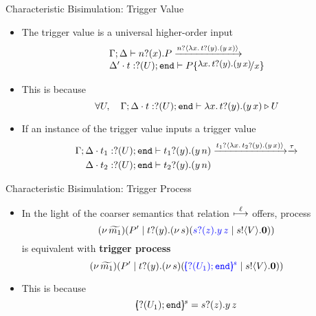 \documentclass{beamer}
\newcommand{\prcolor}[1]{{\color{blue} #1}}
\begin{document}
	\begin{frame}{Characteristic Bisimulation: Trigger Value}
		\begin{itemize}
			\item	The trigger value is a universal higher-order input
				\[
				\begin{array}{l}
					\Gamma; \Delta \proves \binp{n}{x} P
					\by{\bactinp{n}{\abs{x}{\binp{t}{y} (\appl{y}{x})}}}\\
					\Delta' \cat t: \btinp{U} \tinact \proves P \subst{\abs{x}{\binp{t}{y} (\appl{y}{x})}}{x} 
				\end{array}
				\]
			\item	This is because
				\[
					\forall U, \quad \Gamma; \Delta \cdot t: ? (U) ; \mathtt{end} \vdash \lambda x.\,t ? (y) . (y\, {x}) \triangleright U
				\]

			\item	If an instance of the trigger value inputs a trigger value
				\begin{eqnarray*}
					\Gamma; \Delta \cat t_1: \btinp{U} \tinact \proves \binp{t_1}{y} (\appl{y}{n}) & \by{\bactinp{t_1}{\abs{x}{\binp{t_2}{y} (\appl{y}{x})}}} \by{\tau}\\
					\Delta \cat t_2: \btinp{U} \tinact \proves \binp{t_2}{y} (\appl{y}{n}) %
				\end{eqnarray*}
		\end{itemize}
	\end{frame}

	\begin{frame}{Characteristic Bisimulation: Trigger Process}
		\begin{itemize}
			\item	In the light of the coarser semantics that
				relation $\stackrel{\ell}{\longmapsto}$ offers, process
				\[
					\newsp{\widetilde{m_1}}{P' \Par \binp{t}{y}\newsp{s}{\prcolor{\binp{s}{z} \appl{y}{z}} \Par \bout{s}{V} \inact}}
				\]
				is equivalent with {\bf trigger process}
				\[
					\newsp{\widetilde{m_1}}{P' \Par \binp{t}{y}\newsp{s}{\prcolor{\mapchar{\btinp{U_1} \tinact}{s}} \Par \bout{s}{V} \inact}}
				\]
			\item	This is because
				\[
					[\!\!(? (U_1) ; \mathtt{end})\!\!]^{s} = s ? (z) . y\, {z}
				\]
		\end{itemize}
	\end{frame}
\end{document}
